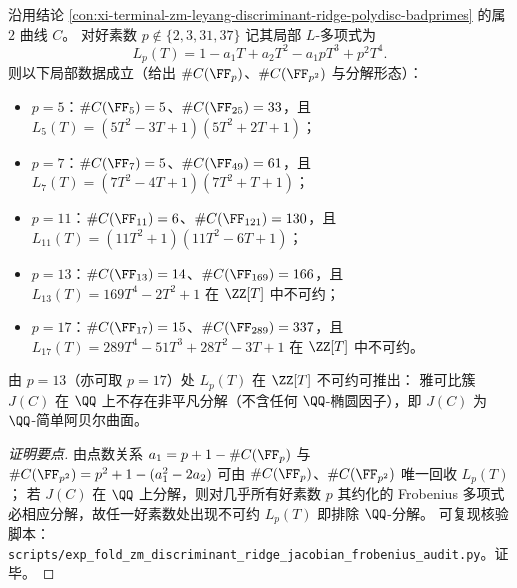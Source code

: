 

\begin{conclusion}\label{con:xi-terminal-zm-discriminant-ridge-jacobian-qsimple}
沿用结论 \ref{con:xi-terminal-zm-leyang-discriminant-ridge-polydisc-badprimes} 的属 \(2\) 曲线 \(C\)。
对好素数 \(p\notin\{2,3,31,37\}\) 记其局部 \(L\)-多项式为
\[
L_{p}(T)=1-a_{1}T+a_{2}T^{2}-a_{1}pT^{3}+p^{2}T^{4}.
\]
则以下局部数据成立（给出 \(\#C(\FF_p)\)、\(\#C(\FF_{p^{2}})\) 与分解形态）：
\begin{itemize}
  \item \(p=5\)：\(\#C(\FF_{5})=5\)、\(\#C(\FF_{25})=33\)，且 \(L_{5}(T)=(5T^{2}-3T+1)(5T^{2}+2T+1)\)；
  \item \(p=7\)：\(\#C(\FF_{7})=5\)、\(\#C(\FF_{49})=61\)，且 \(L_{7}(T)=(7T^{2}-4T+1)(7T^{2}+T+1)\)；
  \item \(p=11\)：\(\#C(\FF_{11})=6\)、\(\#C(\FF_{121})=130\)，且 \(L_{11}(T)=(11T^{2}+1)(11T^{2}-6T+1)\)；
  \item \(p=13\)：\(\#C(\FF_{13})=14\)、\(\#C(\FF_{169})=166\)，且 \(L_{13}(T)=169T^{4}-2T^{2}+1\) 在 \(\ZZ[T]\) 中不可约；
  \item \(p=17\)：\(\#C(\FF_{17})=15\)、\(\#C(\FF_{289})=337\)，且 \(L_{17}(T)=289T^{4}-51T^{3}+28T^{2}-3T+1\) 在 \(\ZZ[T]\) 中不可约。
\end{itemize}
由 \(p=13\)（亦可取 \(p=17\)）处 \(L_{p}(T)\) 在 \(\ZZ[T]\) 不可约可推出：
雅可比簇 \(J(C)\) 在 \(\QQ\) 上不存在非平凡分解（不含任何 \(\QQ\)-椭圆因子），即 \(J(C)\) 为 \(\QQ\)-简单阿贝尔曲面。
\end{conclusion}
\begin{proof}[证明要点]
由点数关系
\(
a_1=p+1-\#C(\FF_p)
\)
与
\(
\#C(\FF_{p^2})=p^2+1-(a_1^2-2a_2)
\)
可由 \(\#C(\FF_p)\)、\(\#C(\FF_{p^2})\) 唯一回收 \(L_p(T)\)；
若 \(J(C)\) 在 \(\QQ\) 上分解，则对几乎所有好素数 \(p\) 其约化的 Frobenius 多项式必相应分解，故任一好素数处出现不可约 \(L_p(T)\) 即排除 \(\QQ\)-分解。
可复现核验脚本：\texttt{scripts/exp\_fold\_zm\_discriminant\_ridge\_jacobian\_frobenius\_audit.py}。证毕。
\end{proof}

